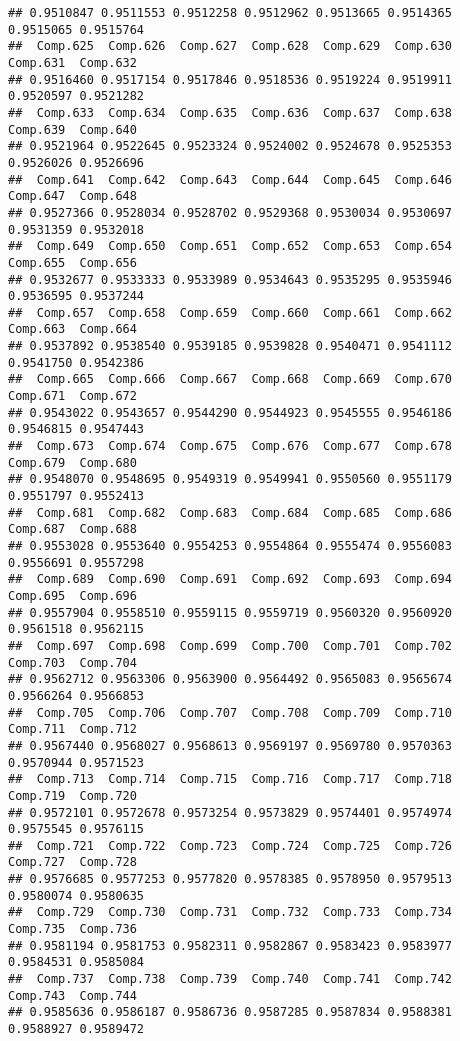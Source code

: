 \documentclass[
]{article}
\begin{document}
\begin{verbatim}
## 0.9510847 0.9511553 0.9512258 0.9512962 0.9513665 0.9514365 0.9515065 0.9515764 
##  Comp.625  Comp.626  Comp.627  Comp.628  Comp.629  Comp.630  Comp.631  Comp.632 
## 0.9516460 0.9517154 0.9517846 0.9518536 0.9519224 0.9519911 0.9520597 0.9521282 
##  Comp.633  Comp.634  Comp.635  Comp.636  Comp.637  Comp.638  Comp.639  Comp.640 
## 0.9521964 0.9522645 0.9523324 0.9524002 0.9524678 0.9525353 0.9526026 0.9526696 
##  Comp.641  Comp.642  Comp.643  Comp.644  Comp.645  Comp.646  Comp.647  Comp.648 
## 0.9527366 0.9528034 0.9528702 0.9529368 0.9530034 0.9530697 0.9531359 0.9532018 
##  Comp.649  Comp.650  Comp.651  Comp.652  Comp.653  Comp.654  Comp.655  Comp.656 
## 0.9532677 0.9533333 0.9533989 0.9534643 0.9535295 0.9535946 0.9536595 0.9537244 
##  Comp.657  Comp.658  Comp.659  Comp.660  Comp.661  Comp.662  Comp.663  Comp.664 
## 0.9537892 0.9538540 0.9539185 0.9539828 0.9540471 0.9541112 0.9541750 0.9542386 
##  Comp.665  Comp.666  Comp.667  Comp.668  Comp.669  Comp.670  Comp.671  Comp.672 
## 0.9543022 0.9543657 0.9544290 0.9544923 0.9545555 0.9546186 0.9546815 0.9547443 
##  Comp.673  Comp.674  Comp.675  Comp.676  Comp.677  Comp.678  Comp.679  Comp.680 
## 0.9548070 0.9548695 0.9549319 0.9549941 0.9550560 0.9551179 0.9551797 0.9552413 
##  Comp.681  Comp.682  Comp.683  Comp.684  Comp.685  Comp.686  Comp.687  Comp.688 
## 0.9553028 0.9553640 0.9554253 0.9554864 0.9555474 0.9556083 0.9556691 0.9557298 
##  Comp.689  Comp.690  Comp.691  Comp.692  Comp.693  Comp.694  Comp.695  Comp.696 
## 0.9557904 0.9558510 0.9559115 0.9559719 0.9560320 0.9560920 0.9561518 0.9562115 
##  Comp.697  Comp.698  Comp.699  Comp.700  Comp.701  Comp.702  Comp.703  Comp.704 
## 0.9562712 0.9563306 0.9563900 0.9564492 0.9565083 0.9565674 0.9566264 0.9566853 
##  Comp.705  Comp.706  Comp.707  Comp.708  Comp.709  Comp.710  Comp.711  Comp.712 
## 0.9567440 0.9568027 0.9568613 0.9569197 0.9569780 0.9570363 0.9570944 0.9571523 
##  Comp.713  Comp.714  Comp.715  Comp.716  Comp.717  Comp.718  Comp.719  Comp.720 
## 0.9572101 0.9572678 0.9573254 0.9573829 0.9574401 0.9574974 0.9575545 0.9576115 
##  Comp.721  Comp.722  Comp.723  Comp.724  Comp.725  Comp.726  Comp.727  Comp.728 
## 0.9576685 0.9577253 0.9577820 0.9578385 0.9578950 0.9579513 0.9580074 0.9580635 
##  Comp.729  Comp.730  Comp.731  Comp.732  Comp.733  Comp.734  Comp.735  Comp.736 
## 0.9581194 0.9581753 0.9582311 0.9582867 0.9583423 0.9583977 0.9584531 0.9585084 
##  Comp.737  Comp.738  Comp.739  Comp.740  Comp.741  Comp.742  Comp.743  Comp.744 
## 0.9585636 0.9586187 0.9586736 0.9587285 0.9587834 0.9588381 0.9588927 0.9589472 

\end{verbatim}
\end{document}
